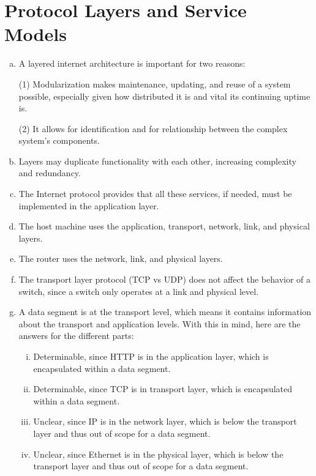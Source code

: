 \documentclass[11pt]{article}
\begin{document}
\section*{Protocol Layers and Service Models}
  \begin{enumerate}[(a)]
    \item
      A layered internet architecture is important for two reasons:

      (1) Modularization makes maintenance, updating, and reuse of a system possible, especially given how
      distributed it is and vital its continuing uptime is.

      (2) It allows for identification and for relationship between the complex
      system's components.
    \item
      Layers may duplicate functionality with each other, increasing complexity
      and redundancy.
    \item
      The Internet protocol provides that all these services, if needed, must be
      implemented in the application layer.
    \item
      The host machine uses the application, transport, network, link, and physical layers.
    \item
      The router uses the network, link, and physical layers.
    \item
      The transport layer protocol (TCP vs UDP) does not affect the behavior of a switch,
      since a switch only operates at a link and physical level.
    \item
      A data segment is at the transport level, which means it contains information
      about the transport and application levels. With this in mind, here are the
      answers for the different parts:
      \begin{enumerate}[(i)]
        \item
          Determinable, since HTTP is in the application layer, which is encapsulated
          within a data segment.
        \item
          Determinable, since TCP is in transport layer, which is encapsulated
          within a data segment.
        \item
          Unclear, since IP is in the network layer, which is below the transport
          layer and thus out of scope for a data segment.
        \item
          Unclear, since Ethernet is in the physical layer, which is below the transport
          layer and thus out of scope for a data segment.
      \end{enumerate}
  \end{enumerate}
\end{document}
